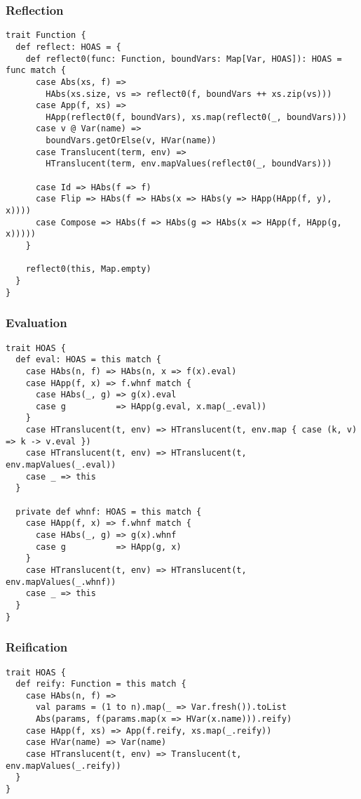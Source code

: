 \documentclass[../../main.tex]{subfiles}
\begin{document}
\subsubsection{Reflection}

\begin{verbatim}
trait Function {
  def reflect: HOAS = {
    def reflect0(func: Function, boundVars: Map[Var, HOAS]): HOAS = func match {
      case Abs(xs, f) =>
        HAbs(xs.size, vs => reflect0(f, boundVars ++ xs.zip(vs)))
      case App(f, xs) =>
        HApp(reflect0(f, boundVars), xs.map(reflect0(_, boundVars)))
      case v @ Var(name) =>
        boundVars.getOrElse(v, HVar(name))
      case Translucent(term, env) =>
        HTranslucent(term, env.mapValues(reflect0(_, boundVars)))

      case Id => HAbs(f => f)
      case Flip => HAbs(f => HAbs(x => HAbs(y => HApp(HApp(f, y), x))))
      case Compose => HAbs(f => HAbs(g => HAbs(x => HApp(f, HApp(g, x)))))
    }

    reflect0(this, Map.empty)
  }
}
\end{verbatim}

\subsubsection{Evaluation}
\begin{verbatim}
trait HOAS {
  def eval: HOAS = this match {
    case HAbs(n, f) => HAbs(n, x => f(x).eval)
    case HApp(f, x) => f.whnf match {
      case HAbs(_, g) => g(x).eval
      case g          => HApp(g.eval, x.map(_.eval))
    }
    case HTranslucent(t, env) => HTranslucent(t, env.map { case (k, v) => k -> v.eval })
    case HTranslucent(t, env) => HTranslucent(t, env.mapValues(_.eval))
    case _ => this
  }

  private def whnf: HOAS = this match {
    case HApp(f, x) => f.whnf match {
      case HAbs(_, g) => g(x).whnf
      case g          => HApp(g, x)
    }
    case HTranslucent(t, env) => HTranslucent(t, env.mapValues(_.whnf))
    case _ => this
  }
}
\end{verbatim}

\subsubsection{Reification}
\begin{verbatim}
trait HOAS {  
  def reify: Function = this match {
    case HAbs(n, f) =>
      val params = (1 to n).map(_ => Var.fresh()).toList
      Abs(params, f(params.map(x => HVar(x.name))).reify)
    case HApp(f, xs) => App(f.reify, xs.map(_.reify))
    case HVar(name) => Var(name)
    case HTranslucent(t, env) => Translucent(t, env.mapValues(_.reify))
  }
}
\end{verbatim}
\end{document}
